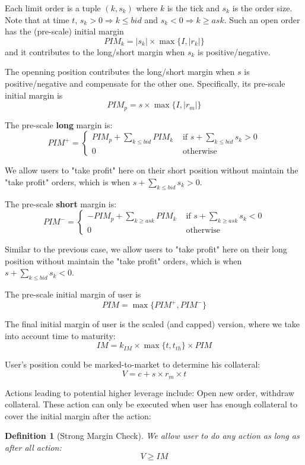\documentclass[notitlepage,reqno,11pt]{amsart}
\numberwithin{equation}{section}
\newtheorem{definition}{Definition}[section]
\newcommand{\RA}{\Rightarrow}
\begin{document}
Each limit order is a tuple $(k, s_k)$ where $k$ is the tick and $s_k$ is the order size. Note that at time $t$, $s_k> 0\RA k\leq bid$ and $s_k< 0\RA k\geq ask$. Such an open order has the (pre-scale) initial margin 
$$PIM_k = |s_k|\times\max\{I,|r_k|\}$$ 
and it contributes to the long/short margin when $s_k$ is positive/negative.

The openning position contributes the long/short margin when $s$ is positive/negative and compensate for the other one. Specifically, its pre-scale initial margin is 
$$PIM_p = s\times\max\{I,|r_m|\}$$

The pre-scale \textbf{long} margin is:
\begin{equation}\label{pim+}
    PIM^+ = \begin{cases}
        PIM_p + \sum_{k\leq bid}PIM_k & \text{ if } s + \sum_{k\leq bid}s_k > 0 \\
        0 & \text{ otherwise}
    \end{cases}
\end{equation}
    

We allow users to "take profit" here on their short position without maintain the "take profit" orders, which is when $s + \sum_{k\leq bid}s_k > 0$.

The pre-scale \textbf{short} margin is:
\begin{equation}\label{pim-}
    PIM^- = \begin{cases}
        -PIM_p + \sum_{k\geq ask}PIM_k & \text{ if } s + \sum_{k\geq ask}s_k < 0 \\
        0 & \text{ otherwise}
    \end{cases}
\end{equation}

Similar to the previous case, we allow users to "take profit" here on their long position without maintain the "take profit" orders, which is when $s + \sum_{k\leq bid}s_k < 0$.

The pre-scale initial margin of user is
$$
PIM = \max\{PIM^+,PIM^-\}
$$

The final initial margin of user is the scaled (and capped) version, where we take into account time to maturity:
$$
IM = k_{IM}\times\max\{t,t_{th}\}\times PIM
$$

User's position could be marked-to-market to determine his collateral:
\begin{equation}
    V = c + s\times r_m\times t
\end{equation}

Actions leading to potential higher leverage include: Open new order, withdraw collateral. These action can only be executed when user has enough collateral to cover the initial margin after the action:
\begin{definition}[Strong Margin Check]\label{strong-margin-check}
We allow user to do any action as long as after all action:
    $$
V \geq IM
$$
\end{definition}
\end{document}

